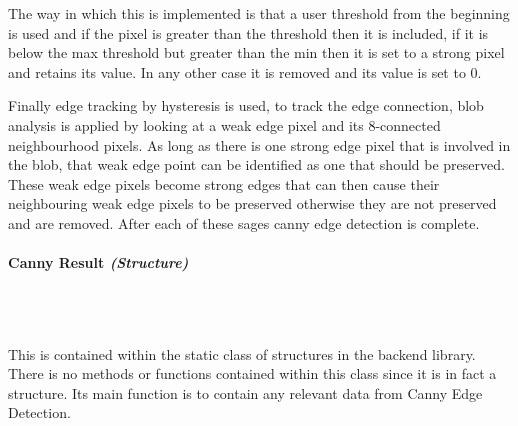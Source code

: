 \begin{FlushLeft}
    The way in which this is implemented is that a user threshold from the beginning is used and if the pixel is greater than the threshold then it is included, if it is below the max threshold but greater than the min then it is set to a strong pixel and retains its value. In any other case it is removed and its value is set to 0. \\ \bk

    Finally edge tracking by hysteresis is used, to track the edge connection, blob analysis is applied by looking at a weak edge pixel and its 8-connected neighbourhood pixels. As long as there is one strong edge pixel that is involved in the blob, that weak edge point can be identified as one that should be preserved. These weak edge pixels become strong edges that can then cause their neighbouring weak edge pixels to be preserved otherwise they are not preserved and are removed. After each of these sages canny edge detection is complete. \\ \bk    
    \bk


    \paragraph{Canny Result \textit{(Structure)}} \mbox{} \\

    \begin{figure}[H]
        \centering
    \end{figure}\\

    This is contained within the static class of structures in the backend library. There is no methods or functions contained within this class since it is in fact a structure. Its main function is to contain any relevant data from Canny Edge Detection.

    \bk


\end{FlushLeft}

